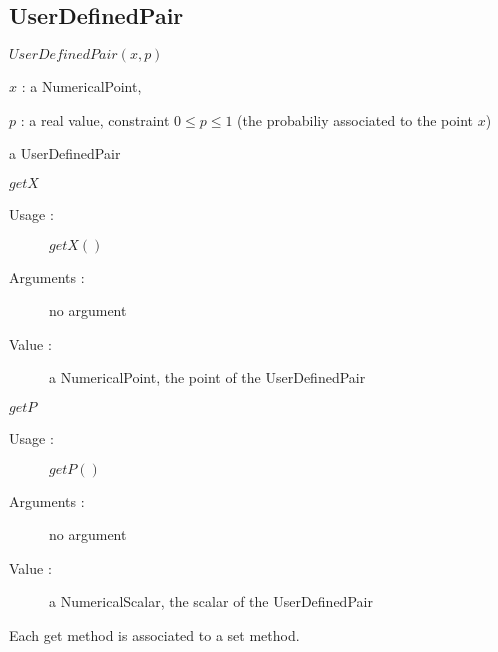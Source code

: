 

\newpage \subsection{UserDefinedPair}

\begin{description}

\item[Usage :] $UserDefinedPair(x,p)$

\item[Arguments :]  \rule{0pt}{1em}
  \begin{description}
  \item $x$ : a NumericalPoint,
  \item $p$ : a real value, constraint $0 \leq p \leq 1$ (the probabiliy associated to the point $x$)
  \end{description}

\item[Value :] a UserDefinedPair

\item[Some methods :]  \rule{0pt}{1em}

  \begin{description}

  \item $getX$
    \begin{description}
    \item[Usage :] $getX()$
    \item[Arguments :] no argument
    \item[Value :] a NumericalPoint, the point of the UserDefinedPair
    \end{description}
    \bigskip

  \item $getP$
    \begin{description}
    \item[Usage :] $getP()$
    \item[Arguments :] no argument
    \item[Value :]  a NumericalScalar, the scalar of the UserDefinedPair
    \end{description}

    Each get method is associated to a set method.
  \end{description}
\end{description}




